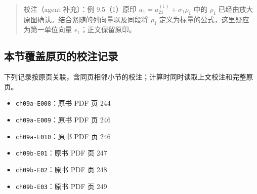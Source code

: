 \documentclass[
  10pt,
  fontset=fandol]{ctexart}
\providecommand{\tightlist}{%
  \setlength{\itemsep}{0pt}\setlength{\parskip}{0pt}}
\begin{document}
\begin{quote}
校注（agent 补充）：例 9.5（1）原印 \(u_1=a_{21}^{(1)}+\sigma_1\rho_1\) 中的 \(\rho_1\) 已经由放大原图确认。结合紧随的列向量以及同段将 \(\rho_1\) 定义为标量的公式，这里疑应为第一单位向量 \(e_1\)；正文保留原印。
\end{quote}

\subsection{本节覆盖原页的校注记录}\label{ux672cux8282ux8986ux76d6ux539fux9875ux7684ux6821ux6ce8ux8bb0ux5f55}

下列记录按原页关联，含同页相邻小节的校注；计算时同时读取上文校注和完整原页。

\begin{itemize}
\tightlist
\item
  \texttt{ch09a-E008}：原书 PDF 页 244
\item
  \texttt{ch09a-E009}：原书 PDF 页 246
\item
  \texttt{ch09a-E010}：原书 PDF 页 246
\item
  \texttt{ch09b-E01}：原书 PDF 页 247
\item
  \texttt{ch09b-E02}：原书 PDF 页 248
\item
  \texttt{ch09b-E03}：原书 PDF 页 249
\end{itemize}
\end{document}
